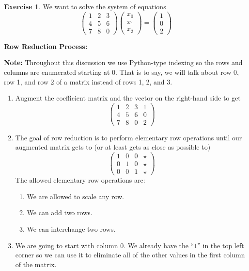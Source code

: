\documentclass[
]{book}
\providecommand{\tightlist}{%
  \setlength{\itemsep}{0pt}\setlength{\parskip}{0pt}}
\theoremstyle{definition}
\theoremstyle{definition}
\theoremstyle{definition}
\newtheorem{exercise}{Exercise}[chapter]
\theoremstyle{remark}
\begin{document}
\begin{exercise}
\protect\hypertarget{exr:unnamed-chunk-312}{}{\label{exr:unnamed-chunk-312} }We want to solve the system of equations
\[ \begin{pmatrix} 1 & 2 & 3 \\ 4 & 5 & 6 \\ 7 & 8 & 0 \end{pmatrix} \begin{pmatrix} x_0 \\ x_1 \\ x_2 \end{pmatrix} = \begin{pmatrix} 1 \\ 0 \\ 2\end{pmatrix} \]

\textbf{Row Reduction Process:}

\textbf{Note:} Throughout this discussion we use Python-type indexing so the rows and columns are enumerated starting at 0. That is to say, we will talk about row 0, row 1, and row 2 of a matrix instead of rows 1, 2, and 3.

\begin{enumerate}
\def\labelenumi{\alph{enumi}.}
\tightlist
\item
  Augment the coefficient matrix and the vector on the right-hand side to get
  \[ \left( \begin{array}{ccc|c} 1 & 2 & 3 & 1 \\ 4 & 5 & 6 & 0 \\ 7 & 8 & 0 & 2 \end{array} \right)\]
\item
  The goal of row reduction is to perform elementary row operations until our augmented matrix gets to (or at least gets as close as possible to)
  \[ \left( \begin{array}{ccc|c} 1 & 0 & 0 & \star \\ 0 & 1 & 0 & \star \\ 0 & 0 & 1 & \star \end{array} \right) \]
  The allowed elementary row operations are:

  \begin{enumerate}
  \def\labelenumii{\roman{enumii}.}
  \tightlist
  \item
    We are allowed to scale any row.
  \item
    We can add two rows.
  \item
    We can interchange two rows.
  \end{enumerate}
\item
  We are going to start with column 0. We already have the ``\(1\)'' in the top left corner so we can use it to eliminate all of the other values in the first column of the matrix.


\end{enumerate}
\end{exercise}
\end{document}
